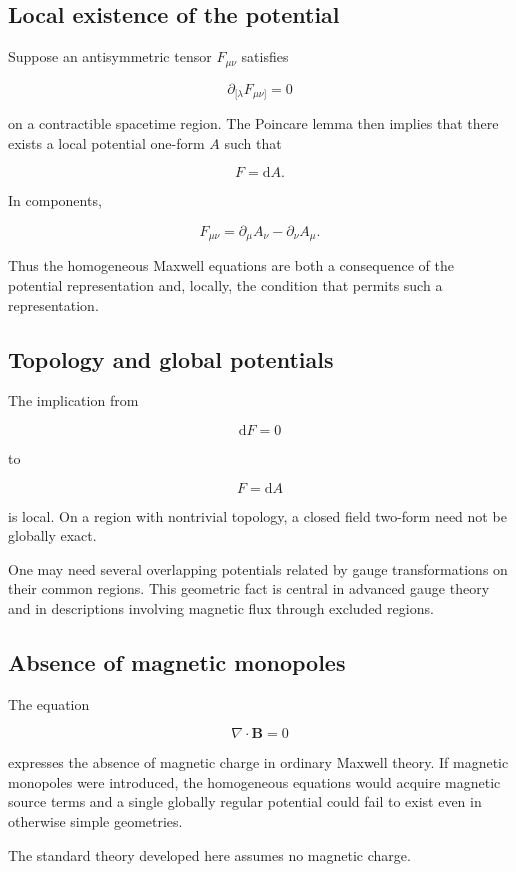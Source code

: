 \subsection{Local existence of the potential}

Suppose an antisymmetric tensor \(F_{\mu\nu}\) satisfies

\[
\partial_{[\lambda}F_{\mu\nu]}=0
\]

on a contractible spacetime region. The Poincare lemma then implies that there exists a local potential one-form \(A\) such that

\[
F=\mathrm{d}A.
\]

In components,

\[
F_{\mu\nu}
=
\partial_{\mu}A_{\nu}
-
\partial_{\nu}A_{\mu}.
\]

Thus the homogeneous Maxwell equations are both a consequence of the potential representation and, locally, the condition that permits such a representation.

\subsection{Topology and global potentials}

The implication from

\[
\mathrm{d}F=0
\]

to

\[
F=\mathrm{d}A
\]

is local. On a region with nontrivial topology, a closed field two-form need not be globally exact.

One may need several overlapping potentials related by gauge transformations on their common regions. This geometric fact is central in advanced gauge theory and in descriptions involving magnetic flux through excluded regions.

\subsection{Absence of magnetic monopoles}

The equation

\[
\nabla\cdot\mathbf{B}=0
\]

expresses the absence of magnetic charge in ordinary Maxwell theory. If magnetic monopoles were introduced, the homogeneous equations would acquire magnetic source terms and a single globally regular potential could fail to exist even in otherwise simple geometries.

The standard theory developed here assumes no magnetic charge.


